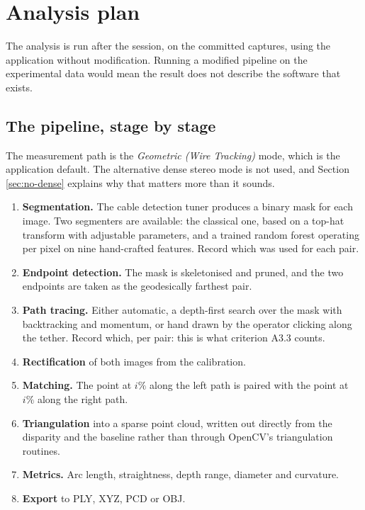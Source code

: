 \chapter{Analysis plan}
\label{chap:analysis}

The analysis is run after the session, on the committed captures, using the
application without modification. Running a modified pipeline on the
experimental data would mean the result does not describe the software that
exists.

\section{The pipeline, stage by stage}

The measurement path is the \emph{Geometric (Wire Tracking)} mode, which is
the application default. The alternative dense stereo mode is not used, and
Section \ref{sec:no-dense} explains why that matters more than it sounds.

\begin{enumerate}
    \item \textbf{Segmentation.} The cable detection tuner produces a binary
    mask for each image. Two segmenters are available: the classical one,
    based on a top-hat transform with adjustable parameters, and a trained
    random forest operating per pixel on nine hand-crafted features. Record
    which was used for each pair.

    \item \textbf{Endpoint detection.} The mask is skeletonised and pruned,
    and the two endpoints are taken as the geodesically farthest pair.

    \item \textbf{Path tracing.} Either automatic, a depth-first search over
    the mask with backtracking and momentum, or hand drawn by the operator
    clicking along the tether. Record which, per pair: this is what criterion
    A3.3 counts.

    \item \textbf{Rectification} of both images from the calibration.

    \item \textbf{Matching.} The point at $i\%$ along the left path is paired
    with the point at $i\%$ along the right path.

    \item \textbf{Triangulation} into a sparse point cloud, written out
    directly from the disparity and the baseline rather than through
    OpenCV's triangulation routines.

    \item \textbf{Metrics.} Arc length, straightness, depth range, diameter
    and curvature.

    \item \textbf{Export} to PLY, XYZ, PCD or OBJ.
\end{enumerate}

